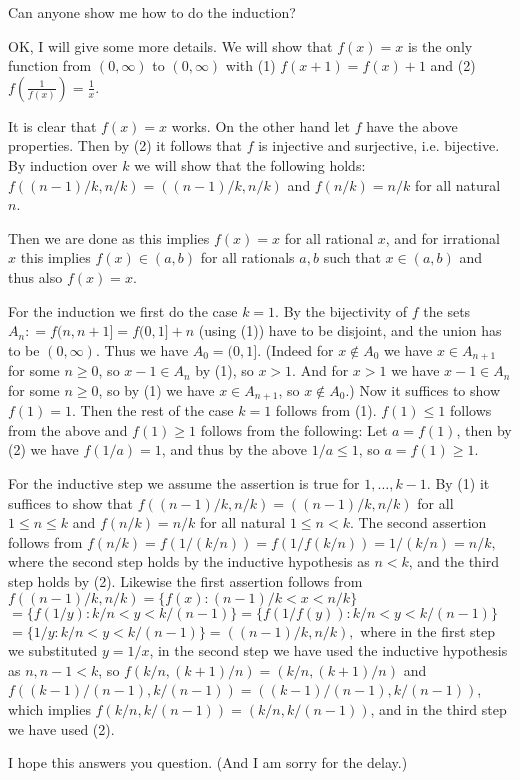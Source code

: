 \begin{mysolution}
	\begin{tcolorbox}Can anyone show me how to do the induction?\end{tcolorbox}

OK, I will give some more details. We will show that $f(x)=x$ is the only function from $(0,\infty)$ to  $(0,\infty)$  with 
(1) $f(x+1)=f(x)+1$  and (2) $f\left(\frac{1}{f(x)}\right)=\frac{1}{x}$. 

It is clear that $f(x)=x$ works.  On the other hand let $f$ have the above properties. 
Then by (2) it follows that $f$ is injective and surjective, i.e. bijective. 
By induction over $k$ we will show that the following holds: 
$f( (n-1)/k,n/k ) = ((n-1)/k,n/k)$ and $f(n/k)=n/k$ for all natural $n$.

Then we are done as this implies $f(x) = x$ for all rational $x$, and for irrational $x$
this implies $f(x) \in (a,b)$ for all rationals $a,b$ such that $x \in (a,b)$ and thus also $f(x) = x$. 
 
For the induction we first do the case $k=1$. 
By the bijectivity of $f$ the sets $A_{n}: = f(n,n+1] = f(0,1]+n$ (using (1)) have to be disjoint, and the union has to be $(0,\infty)$. Thus we have $A_{0}= (0,1]$. (Indeed for $x \notin A_{0}$ we have $x \in A_{n+1}$ for some $n \ge 0$, so $x-1 \in A_{n}$ by (1), so $x>1$. And for $x>1$ we have $x-1 \in A_{n}$ for some $n \ge 0$, so by (1) we have $x \in A_{n+1}$, so $x \notin A_{0}$.) Now it suffices to show $f(1)=1$. Then the rest of the case $k=1$ follows from (1). 
$f(1) \le 1$ follows from the above and $f(1)\ge 1$ follows from the following: Let $a = f(1)$, then by (2) we have $f(1/a) = 1$, and thus by the above $1/a \le 1$, so $a = f(1) \ge 1$. 

For the inductive step we assume the assertion is true for $1,\ldots,k-1$. By (1) it suffices to show that
$f( (n-1)/k,n/k ) = ((n-1)/k,n/k)$ for all $1\le n \le k$ and $f(n/k)=n/k$ for all natural $1 \le n < k$. 
The second assertion follows from 
$f(n/k) = f(1/(k/n))= f(1/f(k/n)) = 1/(k/n) = n/k,$
where the second step holds by the inductive hypothesis as $n<k$, and the third step holds by (2). Likewise the first assertion follows from 
$f((n-1)/k,n/k )= \{f(x): (n-1)/k< x< n/k\}$
$= \{ f(1/y): k/n < y < k/(n-1)\}= \{ f(1/f(y)): k/n < y < k/(n-1)\}$
$= \{ 1/y: k/n < y < k/(n-1)\}= ((n-1)/k,n/k),$
where in the first step we substituted $y = 1/x$, in the second step we have used  the inductive hypothesis as $n,n-1 < k$, so $f(k/n,(k+1)/n) = (k/n,(k+1)/n)$ and $f((k-1)/(n-1), k/(n-1)) = ((k-1)/(n-1), k/(n-1))$, which implies $f(k/n,k/(n-1)) = (k/n,k/(n-1))$, and in the third step we have used (2). 

I hope this answers you question. (And I am sorry for the delay.)
\end{mysolution}




